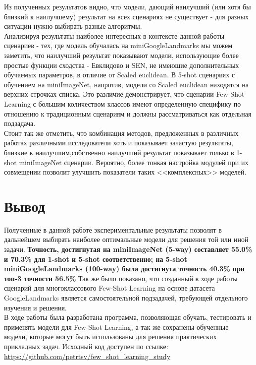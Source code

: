 \documentclass[a4paper, 12pt]{report}
\begin{document}
Из полученных результатов видно, что модели, дающий наилучший (или хотя бы близкий к наилучшему) результат на всех сценариях не существует - для разных ситуации нужно выбирать разные алгоритмы. \\

Анализируя результаты наиболее интересных в контексте данной работы сценариев - тех, где модель обучалась на miniGoogleLandmarks мы можем заметить, что наилучший результат показывают модели, использующие более простые функции сходства - Евклидово и SEN, не имеющие дополнительных обучаемых параметров, в отличие от Scaled euclidean. В 5-shot сценариях с обучением на miniImageNet, напротив, модели со Scaled euclidean находятся на верхних строчках списка. Это различие демонстрирует, что сценарии Few-Shot Learning с большим количеством классов имеют определенную специфику по отношению к традиционным сценариям и должны рассматриваться как отдельная подзадача. \\

Стоит так же отметить, что комбинация методов, предложенных в различных работах различными исследователи хоть и показывает зачастую результаты, близкие к наилучшим,собственно  наилучший результат показывает только в 1-shot miniImageNet сценарии. Вероятно, более тонкая настройка модулей при их совмещении позволит улучшить показатели таких <<комплексных>> моделей.


\chapter{Вывод}

Полученные в данной работе экспериментальные результаты позволят в дальнейшем выбирать наиболее оптимальные модели для решения той или иной задачи. \textbf{Точность, достигнутая на miniImageNet (5-way) составляет 55.0\% и 70.3\% для 1-shot и 5-shot соответственно; на 5-shot miniGoogleLandmarks (100-way) была достигнута точность 40.3\% при топ-3 точности 56.5\%} Так же было показано, что созданный в ходе работы сценарий для многоклассового Few-Shot Learning на основе датасета GoogleLandmarks \cite{google} является самостоятельной подзадачей, требующей отдельного изучения и решения. \\

В ходе работы была разработана программа, позволяющая обучать, тестировать и применять модели для Few-Shot Learning, а так же сохранены обученные модели, которые могут быть использованы для решения практических прикладных задач. Исходный код доступен по ссылке: \url{https://github.com/petrtsv/few_shot_learning_study}\\
\end{document}
